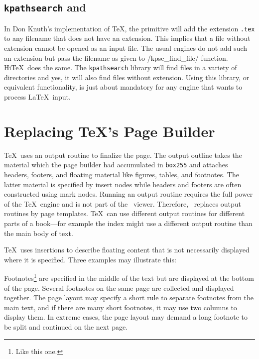 \subsection{{\tt kpathsearch} and }
In Don Knuth's implementation of \TeX, the  primitive
will add the extension {\tt .tex} to any filename that does not have an
extension. This implies that a file without extension cannot be opened
as an input file. The usual engines do not add such an extension but
pass the filename as given to \verbatim/kpse_find_file/ function. 
Hi\TeX\ does the same. The {\tt kpathsearch} library will find files
in a variety of directories and yes, it will also find files without
extension. Using this library, or equivalent functionality, is just about
mandatory for any engine that wants to process \LaTeX\ input.


\section{Replacing \TeX's Page Builder}\label{build}

\TeX\ uses an output routine to finalize the page. 
The output outline takes the material which the page builder had accumulated in {\tt box255}
and attaches headers, footers, and floating material
like figures, tables, and footnotes. The latter material is specified by insert nodes
while headers and footers are often constructed using mark nodes.
Running an output routine requires the full power of the \TeX\ engine and is not 
part of the \HINT\ viewer. Therefore, \HINT\ replaces output routines by page templates.
\TeX\ can use different output routines for different parts of a book---for example
the index might use a different output routine than the main body of text.

\TeX\ uses insertions to describe floating content that is not necessarily displayed 
where it is specified. Three examples may illustrate this:
\itemize
\item Footnotes\footnote*{Like this one.}  are specified in the middle of the text but are displayed at the
bottom of the page.  Several
footnotes on the same page are collected and displayed together. The
page layout may specify a short rule to separate footnotes from the
main text, and if there are many short footnotes, it may use two columns
to display them.  In extreme cases, the page layout may demand a long
footnote to be split and continued on the next page.

